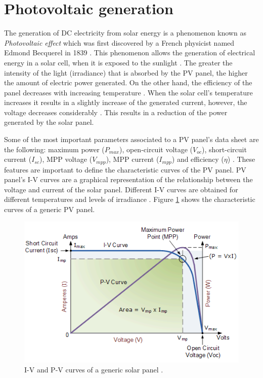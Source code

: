 \section{Photovoltaic generation}

The generation of DC electricity from solar energy is a phenomenon known as \textit{Photovoltaic effect} which was first discovered by a French physicist named Edmond Becquerel in 1839 \cite{PVeffect}. This phenomenon allows the generation of electrical energy in a solar cell, when it is exposed to the sunlight \cite{PVeffect}. The greater the intensity of the light (irradiance) that is absorbed by the PV panel, the higher the amount of electric power generated. On the other hand, the efficiency of the panel decreases with increasing temperature \cite{handbook}. When the solar cell's temperature increases it results in a slightly increase of the generated current, however, the voltage decreases considerably \cite{handbook}. This results in a reduction of the power generated by the solar panel.

Some of the most important parameters associated to a PV panel’s data sheet are the following: maximum power ($P_{max}$), open-circuit voltage ($V_{oc}$), short-circuit current ($I_{sc}$), MPP voltage ($V_{mpp}$), MPP current ($I_{mpp}$) and efficiency ($\eta$) \cite{handbook}.
These features are important to define the characteristic curves of the PV panel. PV panel's I-V curves are a graphical representation of the relationship between the voltage and current of the solar panel. Different I-V curves are obtained for different temperatures and levels of irradiance \cite{IVcurves}. Figure \ref{fig:mpp} shows the characteristic curves of a generic PV panel. 

\begin{figure}[H]
	\begin{center}
		\includegraphics[width=0.8\linewidth]{../Pictures/IVcurve1}
		\caption{I-V and P-V curves of a generic solar panel \cite{IVcurves}.}
		\label{fig:mpp}
	\end{center}
\end{figure}


